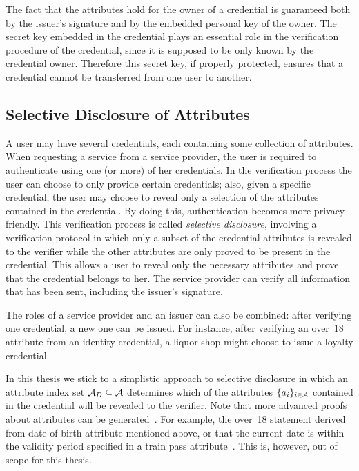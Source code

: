 The fact that the attributes hold for the owner of a
credential is guaranteed both by the issuer's signature and by the embedded
personal key of the owner. The secret key embedded in the credential plays an 
essential role in the verification procedure of 
the credential, since it is supposed to be only known by the credential owner. 
Therefore this secret key, if properly protected, ensures that a credential 
cannot be transferred from one user to another.

\subsection{Selective Disclosure of Attributes}

A user may have several credentials, each containing some collection of
attributes. When requesting a service from a service provider,
the user is required to authenticate using one (or more)
of her credentials. In the verification process the user can choose to only
provide certain credentials; also, given a specific credential, the user may
choose to reveal only a selection of the attributes
 contained in the credential. By doing this, authentication
 becomes more privacy friendly. This verification process
is called \emph{selective disclosure}, involving
a verification protocol in which only a subset of the credential attributes
is revealed to the verifier while the other attributes are only proved to be
present in the credential. This allows a user to reveal only the necessary
attributes and prove that the credential belongs to her. The service provider
can verify all information that has been sent, including the issuer's signature.

The roles of a service provider and an issuer can also be
combined: after verifying one credential, a new one can be issued. For instance,
after verifying an \textsf{over~18} attribute from an identity
 credential, a liquor shop might choose to issue a
\textsf{loyalty} credential.

In this thesis we stick to a simplistic approach to selective disclosure in
which an attribute index set $\mathcal{A}_D \subseteq \mathcal{A}$
determines which of the attributes $\{a_i\}_{i \in \mathcal{A}}$
contained in the credential will be revealed to the verifier. Note that more
advanced proofs about attributes can be generated~\cite{IdemixCrypto2012}. For
example, the \textsf{over~18} statement  derived
from \textsf{date of birth} attribute mentioned above, or that the current date
is within the validity period specified in a \textsf{train pass}
attribute~\cite{Rogaar2011}. This is, however, out of scope for this thesis.

